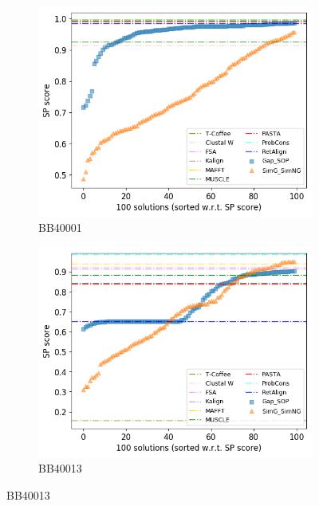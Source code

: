\begin{figure}[!htbp]
	\centering
	\begin{adjustwidth}{-1cm}{-1cm}
		\begin{subfigure}{0.22\textwidth}
			\includegraphics[width=\columnwidth]{Figure/summary/precomputedInit/Balibase/BB40001_pairs_density_single_run_2}
			\caption{BB40001}
		\end{subfigure}	
		\begin{subfigure}{0.22\textwidth}
			\includegraphics[width=\columnwidth]{Figure/summary/precomputedInit/Balibase/BB40013_pairs_density_single_run_2}
			\caption{BB40013}
		\end{subfigure}

\end{adjustwidth}
\end{figure}
